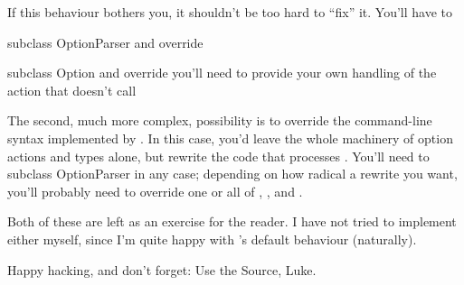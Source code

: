 If this behaviour bothers you, it shouldn't be too hard to ``fix'' it.
You'll have to
\begin{list}{)}
{
\setlength{\rightmargin}{\leftmargin}
}
\item {} 
subclass OptionParser and override 

\item {} 
subclass Option and override you'll
need to provide your own handling of the  action that
doesn't call 

\end{list}

The second, much more complex, possibility is to override the
command-line syntax implemented by .  In this case, you'd leave the
whole machinery of option actions and types alone, but rewrite the code
that processes .  You'll need to subclass OptionParser in any
case; depending on how radical a rewrite you want, you'll probably need
to override one or all of , , and
.

Both of these are left as an exercise for the reader.  I have not tried
to implement either myself, since I'm quite happy with 's default
behaviour (naturally).

Happy hacking, and don't forget: Use the Source, Luke.

